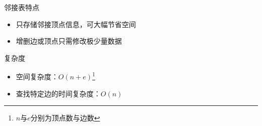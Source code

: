 \begin{frame}
    \frametitle{\insertsectionhead}
    \begin{exampleblock}{邻接表特点}
        \begin{itemize}
            \item 只存储邻接顶点信息，可大幅节省空间
            \item 增删边或顶点只需修改极少量数据
        \end{itemize}
    \end{exampleblock}
    \begin{exampleblock}{复杂度}
        \begin{itemize}
            \item 空间复杂度：$O(n+e)$\footnote{$n$与$e$分别为顶点数与边数}
            \item 查找特定边的时间复杂度：$O(n)$
        \end{itemize}
    \end{exampleblock}
\end{frame}

